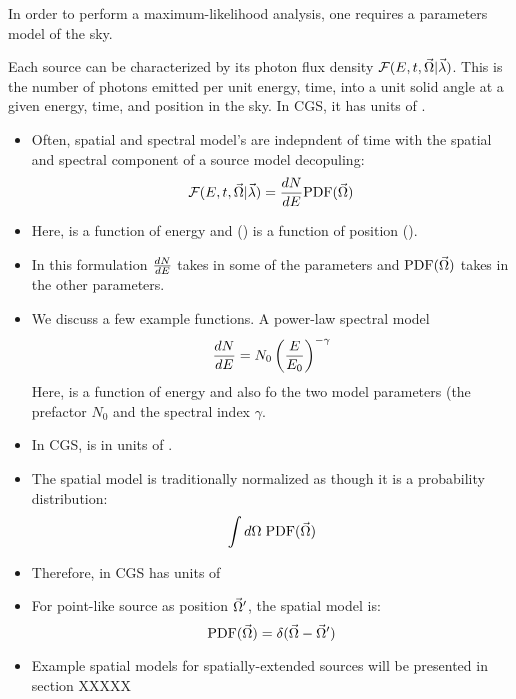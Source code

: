 
In order to perform a maximum-likelihood analysis, one requires
a parameters model of the sky.

Each source can be characterized by its photon flux density 
  $\mathcal{F}(E,t,\vec\Omega|\vec\lambda)$.
This is the number of photons emitted per unit energy, time, into a unit solid angle
at a given energy, time, and position in the sky.
In \ac{CGS}, it has units of \fluxdensityunits.


\begin{itemize}
\item Often, spatial and spectral model's are indepndent of time
  with the spatial and spectral component of a source model decopuling:
  \begin{equation}
    \mathcal{F}(E,t,\vec\Omega|\vec\lambda) = \frac{dN}{dE} \text{PDF}(\vec\Omega)
  \end{equation}
\item Here, \dnde is a function of energy and \pdf(\solidangle) is a
function of position (\solidangle).
\item In this formulation $\frac{dN}{dE}$ takes in some of the \modelparams parameters
  and $\text{PDF}(\vec\Omega)$ takes in the other parameters.
\item
  We discuss a few example \dnde functions.
  A power-law spectral model
  \begin{equation}
    \frac{dN}{dE} = N_0 \left(\frac{E}{E_0}\right)^{-\gamma}
  \end{equation}
  Here, \dnde is a function of energy and also fo the two model parameters (the prefactor $N_0$ and
  the spectral index $\gamma$.

\item In \ac{CGS}, \dnde is in units of \prefunits.

\item The spatial model is traditionally normalized as though it is a probability
  distribution:
  \begin{equation}
    \int d\Omega \; \text{PDF}(\vec\Omega)
  \end{equation}
\item Therefore, in \ac{CGS} \pdf has units of \pdfunits

\item For point-like source as position $\vec\Omega'$, the spatial model is:
  \begin{equation}
    \text{PDF}(\vec\Omega) = \delta(\vec\Omega - \vec\Omega')
  \end{equation}
\item Example spatial models for spatially-extended sources will be presented
  in section XXXXX



\end{itemize}
